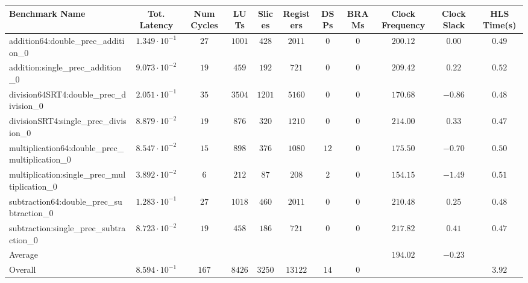 \begin{tabular}{|l|c|c|c|c|c|c|c|c|c|c|}
\hline
Benchmark Name                                   & Tot. Latency            & Num Cycles & LUTs     & Slices   & Registers & DSPs   & BRAMs & Clock Frequency & Clock Slack & HLS Time(s) \\
\hline
addition64:double\_prec\_addition\_0             & $ 1.349 \cdot 10^{-1} $ & $ 27     $ & $ 1001 $ & $ 428  $ & $ 2011  $ & $ 0  $ & $ 0 $ & $ 200.12      $ & $ 0.00    $ & $ 0.49    $ \\
addition:single\_prec\_addition\_0               & $ 9.073 \cdot 10^{-2} $ & $ 19     $ & $ 459  $ & $ 192  $ & $ 721   $ & $ 0  $ & $ 0 $ & $ 209.42      $ & $ 0.22    $ & $ 0.52    $ \\
division64SRT4:double\_prec\_division\_0         & $ 2.051 \cdot 10^{-1} $ & $ 35     $ & $ 3504 $ & $ 1201 $ & $ 5160  $ & $ 0  $ & $ 0 $ & $ 170.68      $ & $ -0.86   $ & $ 0.48    $ \\
divisionSRT4:single\_prec\_division\_0           & $ 8.879 \cdot 10^{-2} $ & $ 19     $ & $ 876  $ & $ 320  $ & $ 1210  $ & $ 0  $ & $ 0 $ & $ 214.00      $ & $ 0.33    $ & $ 0.47    $ \\
multiplication64:double\_prec\_multiplication\_0 & $ 8.547 \cdot 10^{-2} $ & $ 15     $ & $ 898  $ & $ 376  $ & $ 1080  $ & $ 12 $ & $ 0 $ & $ 175.50      $ & $ -0.70   $ & $ 0.50    $ \\
multiplication:single\_prec\_multiplication\_0   & $ 3.892 \cdot 10^{-2} $ & $ 6      $ & $ 212  $ & $ 87   $ & $ 208   $ & $ 2  $ & $ 0 $ & $ 154.15      $ & $ -1.49   $ & $ 0.51    $ \\
subtraction64:double\_prec\_subtraction\_0       & $ 1.283 \cdot 10^{-1} $ & $ 27     $ & $ 1018 $ & $ 460  $ & $ 2011  $ & $ 0  $ & $ 0 $ & $ 210.48      $ & $ 0.25    $ & $ 0.48    $ \\
subtraction:single\_prec\_subtraction\_0         & $ 8.723 \cdot 10^{-2} $ & $ 19     $ & $ 458  $ & $ 186  $ & $ 721   $ & $ 0  $ & $ 0 $ & $ 217.82      $ & $ 0.41    $ & $ 0.47    $ \\
\hline
Average                                          & $                     $ & $        $ & $      $ & $      $ & $       $ & $    $ & $   $ & $ 194.02      $ & $ -0.23   $ & $         $ \\
\hline
Overall                                          & $ 8.594 \cdot 10^{-1} $ & $ 167    $ & $ 8426 $ & $ 3250 $ & $ 13122 $ & $ 14 $ & $ 0 $ & $             $ & $         $ & $ 3.92    $ \\
\hline
\end{tabular}
